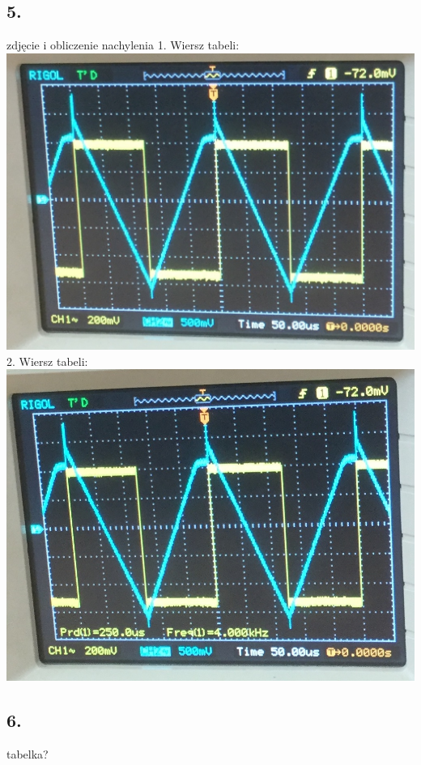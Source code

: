 \documentclass[polish,a4paper]{article}
\begin{document}
\subsection*{5.}
zdjęcie i obliczenie nachylenia
1. Wiersz tabeli: \includegraphics[scale=0.5]{r1c4}\\
2. Wiersz tabeli: \includegraphics[scale=0.5]{r2c4}
\subsection*{6.}
tabelka?
\end{document}
